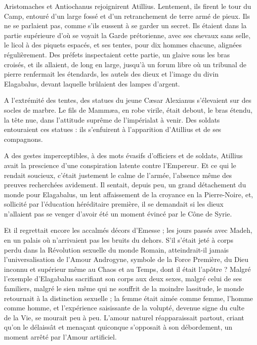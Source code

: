 \documentclass[a4paper, 11pt, oneside, polutonikogreek, french]{article}
\begin{document}
Aristomaches et Antiochanus rejoignirent Atillius. Lentement, ils firent le tour du Camp, entouré d'un large fossé et d'un retranchement de terre armé de pieux. Ils ne se parlaient pas, comme s'ils eussent à se garder un secret. Ils étaient dans la partie supérieure d'où se voyait la Garde prétorienne, avec ses chevaux sans selle, le licol à des piquets espacés, et ses tentes, pour dix hommes chacune, alignées régulièrement. Des préfets inspectaient cette partie, un glaive sous les bras croisés, et ils allaient, de long en large, jusqu'à un forum libre où un tribunal de pierre renfermait les étendards, les autels des dieux et l'image du divin Elagabalus, devant laquelle brûlaient des lampes d'argent.

A l'extrémité des tentes, des statues du jeune Cæsar Alexianus s'élevaient sur des socles de marbre. Le fils de Mammæa, en robe virile, était debout, le bras étendu, la tête nue, dans l'attitude suprême de l'impérialat à venir. Des soldats entouraient ces statues : ils s'enfuirent à l'apparition d'Atillius et de ses compagnons.

A des gestes imperceptibles, à des mots évasifs d'officiers et de soldats, Atillius avait la prescience d'une conspiration latente contre l'Empereur. Et ce qui le rendait soucieux, c'était justement le calme de l'armée, l'absence même des preuves recherchées avidement. Il sentait, depuis peu, un grand détachement du monde pour Elagabalus, un lent affaissement de la croyance en la Pierre-Noire, et, sollicité par l'éducation héréditaire première, il se demandait si les dieux n'allaient pas se venger d'avoir été un moment évincé par le Cône de Syrie.

Et il regrettait encore les accalmés décors d'Emesse ; les jours passés avec Madeh, en un palais où n'arrivaient pas les bruits du dehors. S'il s'était jeté à corps perdu dans la Révolution sexuelle du monde Romain, atteindrait-il jamais l'universalisation de l'Amour Androgyne, symbole de la Force Première, du Dieu inconnu et supérieur même au Chaos et au Temps, dont il était l'apôtre ? Malgré l'exemple d'Elagabalus sacrifiant son corps aux deux sexes, malgré celui de ses familiers, malgré le sien même qui ne souffrit de la moindre lassitude, le monde retournait à la distinction sexuelle ; la femme était aimée comme femme, l'homme comme homme, et l'expérience saisissante de la volupté, devenue signe du culte de la Vie, se mourait peu à peu. L'amour naturel réapparaissait partout, criant qu'on le délaissât et menaçant quiconque s'opposait à son débordement, un moment arrêté par l'Amour artificiel.
\end{document}
